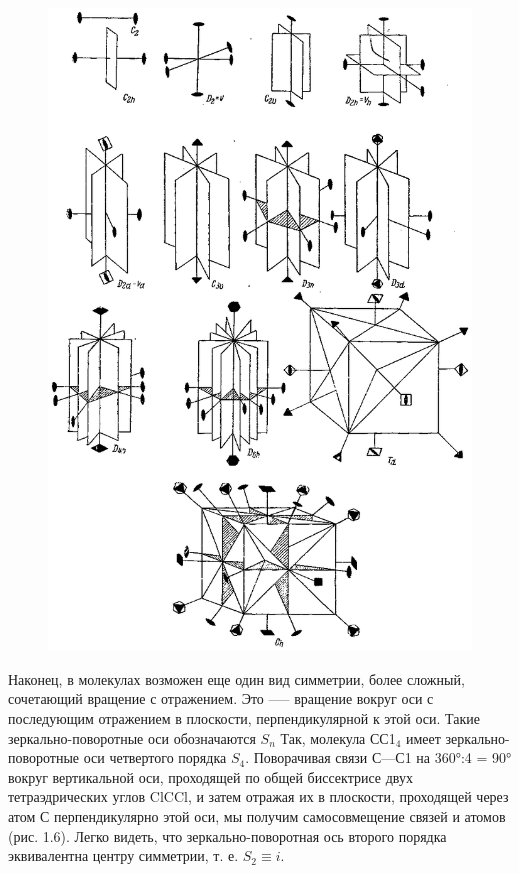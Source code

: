 \begin{figure}[tbp]
\centerline{\hbox{\includegraphics[scale=1]{Ris/ris_eps/ris1_06.eps}}}

\end{figure}
Наконец, в молекулах возможен еще один вид симметрии, более сложный, сочетающий вращение с отражением. Это --— вращение вокруг оси с последующим отражением в плоскости, перпендикулярной к этой оси. Такие зеркально-поворотные оси обозначаются $S_n$ Так,   молекула   СС1$_4$  имеет  зеркально-поворотные   оси   четвертого порядка   $S_4$. Поворачивая связи \hbox{С---С1} на 360°:4 = 90° вокруг вертикальной оси, проходящей по общей биссектрисе двух  тетраэдрических  углов ClCCl, и затем отражая их в плоскости, проходящей через атом С перпендикулярно этой оси, мы получим самосовмещение связей и атомов (рис. 1.6). Легко видеть, что зеркально-поворотная ось второго порядка эквивалентна центру симметрии, т. е. $S_2\equiv i$.

